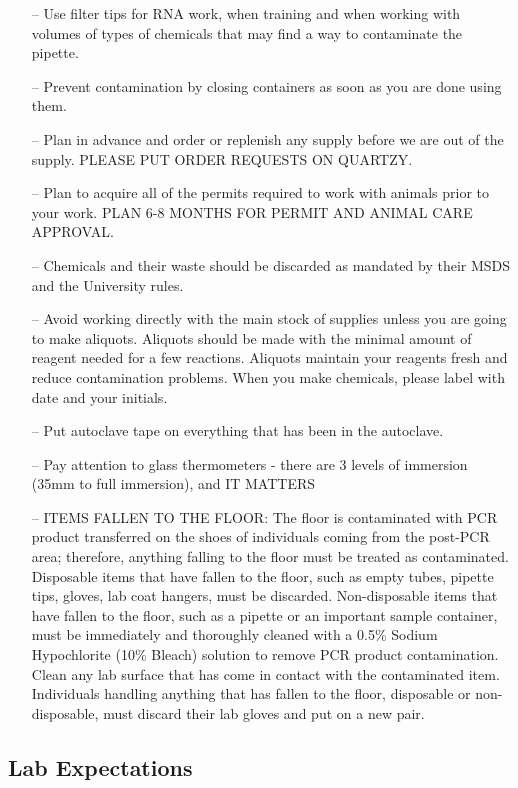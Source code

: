 \documentclass[11pt, oneside]{article}
\begin{document}
\begin{itemize}
			\item[--] Use filter tips for RNA work, when training and when working with volumes of types of chemicals that may find a way to 					contaminate the pipette. 
			\item[--] Prevent contamination by closing containers as soon as you are done using them. 
			\item[--] Plan in advance and order or replenish any supply before we are out of the supply.  PLEASE PUT ORDER REQUESTS ON QUARTZY.
			\item[--] Plan to acquire all of the permits required to work with animals prior to your work.  PLAN 6-8 MONTHS FOR PERMIT AND ANIMAL CARE APPROVAL.
			\item[--] Chemicals and their waste should be discarded as mandated by their MSDS and the University rules.
			\item[--] Avoid working directly with the main stock of supplies unless you are going to make aliquots. Aliquots should be made with the 				minimal amount of reagent needed for a few reactions. Aliquots maintain your reagents fresh and reduce contamination problems. When you make chemicals, please label with date and your initials.
			\item[--] Put autoclave tape on everything that has been in the autoclave.
			\item[--] Pay attention to glass thermometers - there are 3 levels of immersion (35mm to full immersion), and IT MATTERS
			\item[--] ITEMS FALLEN TO THE FLOOR: The floor is contaminated with PCR product transferred on the shoes of individuals coming from the post-PCR area; therefore, anything falling to the floor must be treated as contaminated. Disposable items that have fallen to the floor, such as empty tubes, pipette tips, gloves, lab coat hangers, must be discarded. Non-disposable items that have fallen to the floor, such as a pipette or an important sample container, must be immediately and thoroughly cleaned with a 0.5\% Sodium Hypochlorite (10\% Bleach) solution to remove PCR product contamination. Clean any lab surface that has come in contact with the contaminated item. Individuals handling anything that has fallen to the floor, disposable or non- disposable, must discard their lab gloves and put on a new pair.
		\end{itemize}

	\newpage

	\subsection{Lab Expectations}
\end{document}
